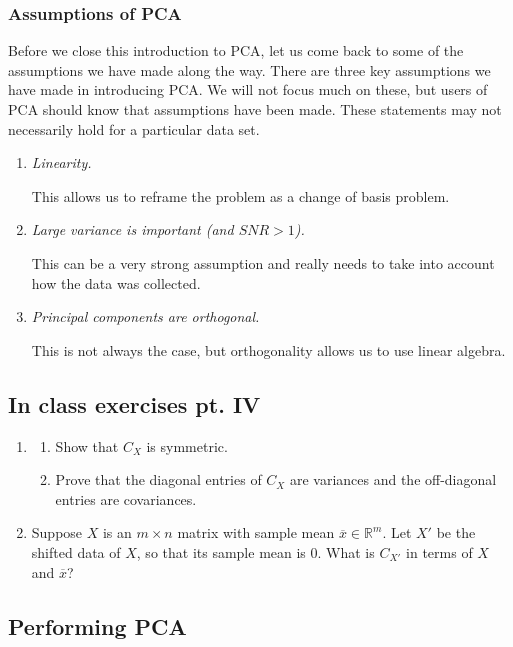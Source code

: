 \documentclass[a4paper, 12pt]{article}
\numberwithin{equation}{section}
\numberwithin{figure}{section}
\theoremstyle{definition}
\newcommand{\R}{\mathbb{R}}
\begin{document}
\subsubsection{Assumptions of PCA}

Before we close this introduction to PCA, let us come back to some of the
assumptions we have made along the way. There are three key assumptions we have
made in introducing PCA. We will not focus much on these, but users of PCA
should know that assumptions have been made. These statements may not
necessarily hold for a particular data set. 

\begin{enumerate}
	\item \textit{Linearity.} 
	
	This allows us to reframe the problem as a change of basis problem. 

	\item \textit{Large variance is important (and $SNR>1$).}
	
	This can be a very strong assumption and really needs to take into account
	how the data was collected. 
	
	\item \textit{Principal components are orthogonal.}
	
	This is not always the case, but orthogonality allows us to use linear
	algebra. 
\end{enumerate}

\subsection{In class exercises pt. IV}

\begin{enumerate}
	\item 
	\begin{enumerate}
		\item Show that $C_X$ is symmetric. 
		\item Prove that the diagonal entries of $C_X$ are variances and the
		off-diagonal entries are covariances. 
	\end{enumerate}
	\item Suppose $X$ is an $m\times n$ matrix with sample mean
	$\overline{x}\in\R^m$. Let $X'$ be the shifted data of $X$, so that its
	sample mean is $0$. What is $C_{X'}$ in terms of $X$ and $\overline{x}$?
\end{enumerate}

\subsection{Performing PCA}\label{sec:perform-pca}
\end{document}
